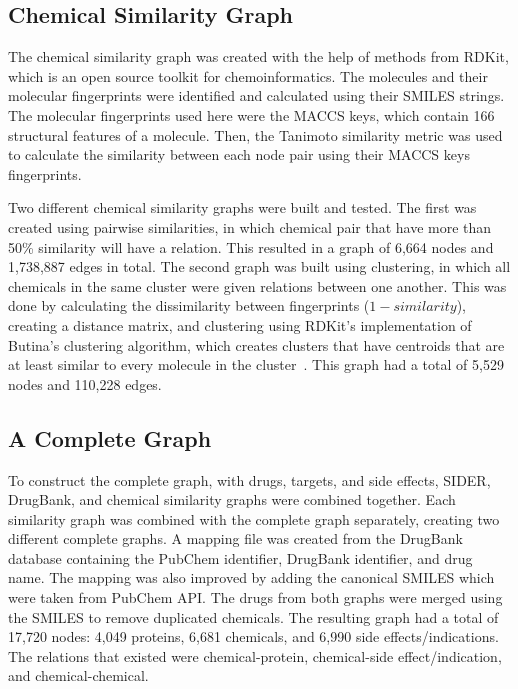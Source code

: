 \subsection{Chemical Similarity Graph}

The chemical similarity graph was created with the help of methods from RDKit, which is an open source toolkit for chemoinformatics.
The molecules and their molecular fingerprints were identified and calculated using their \ac{SMILES} strings.
The molecular fingerprints used here were the MACCS keys, which contain 166 structural features of a molecule.
Then, the Tanimoto similarity metric was used to calculate the similarity between each node pair using their MACCS keys fingerprints.

Two different chemical similarity graphs were built and tested.
The first was created using pairwise similarities, in which chemical pair that have more than 50\% similarity will have a relation.
This resulted in a graph of 6,664 nodes and 1,738,887 edges in total.
The second graph was built using clustering, in which all chemicals in the same cluster were given relations between one another.
This was done by calculating the dissimilarity between fingerprints ($1 - similarity$), creating a distance matrix, and clustering using RDKit's implementation of Butina's clustering algorithm, which creates clusters that have centroids that are at least similar to every molecule in the cluster~\cite{butina_unsupervised_1999}.
This graph had a total of 5,529 nodes and 110,228 edges.

\subsection{A Complete Graph}

To construct the complete graph, with drugs, targets, and side effects, \ac{SIDER}, DrugBank, and chemical similarity graphs were combined together.
Each similarity graph was combined with the complete graph separately, creating two different complete graphs.
A mapping file was created from the DrugBank database containing the PubChem identifier, DrugBank identifier, and drug name.
The mapping was also improved by adding the canonical \ac{SMILES} which were taken from PubChem API\@.
The drugs from both graphs were merged using the SMILES to remove duplicated chemicals.
The resulting graph had a total of 17,720 nodes: 4,049 proteins, 6,681 chemicals, and 6,990 side effects/indications.
The relations that existed were chemical-protein, chemical-side effect/indication, and chemical-chemical.

